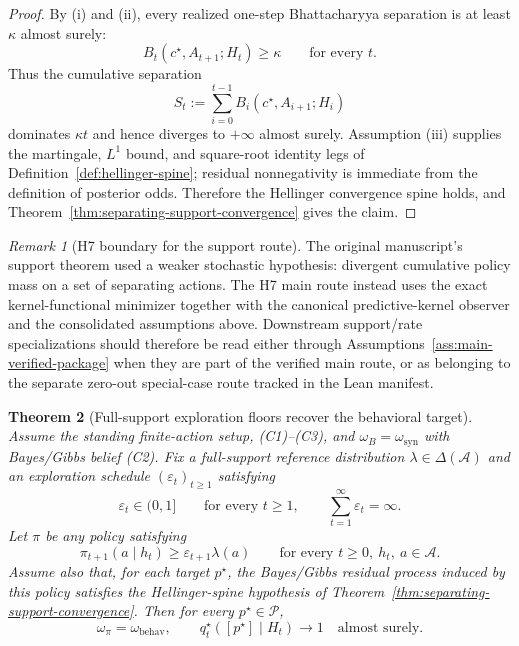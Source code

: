\documentclass[11pt]{article}
\newtheorem{theorem}{Theorem}[section]
\theoremstyle{definition}
\theoremstyle{remark}
\newtheorem{remark}[theorem]{Remark}
\newcommand{\Acal}{\mathcal{A}}
\newcommand{\Pcal}{\mathcal{P}}
\begin{document}
\begin{proof}
By (i) and (ii), every realized one-step Bhattacharyya separation is at least $\kappa$ almost surely:
\[
B_t(c^\star,A_{t+1};H_t)\ge \kappa
\qquad
\text{for every }t.
\]
Thus the cumulative separation
\[
S_t:=\sum_{i=0}^{t-1}B_i(c^\star,A_{i+1};H_i)
\]
dominates $\kappa t$ and hence diverges to $+\infty$ almost surely. Assumption (iii) supplies the martingale, $L^1$ bound, and square-root identity legs of Definition~\ref{def:hellinger-spine}; residual nonnegativity is immediate from the definition of posterior odds. Therefore the Hellinger convergence spine holds, and Theorem~\ref{thm:separating-support-convergence} gives the claim.
\end{proof}

\begin{remark}[H7 boundary for the support route]
\label{rem:h6-support-boundary}
The original manuscript's support theorem used a weaker stochastic hypothesis:
divergent cumulative policy mass on a set of separating actions. The H7 main
route instead uses the exact kernel-functional minimizer together with the
canonical predictive-kernel observer and the consolidated assumptions above.
Downstream support/rate specializations should therefore be read either through
Assumptions~\ref{ass:main-verified-package} when they are part of the verified
main route, or as belonging to the separate zero-out special-case route tracked
in the Lean manifest.
\end{remark}

\begin{theorem}[Full-support exploration floors recover the behavioral target]
\label{thm:exploration-floor-behavioral}
Assume the standing finite-action setup, \textup{(C1)--(C3)}, and $\omega_B=\omega_{\mathrm{syn}}$ with Bayes/Gibbs belief \textup{(C2)}. Fix a full-support reference distribution $\lambda\in\Delta(\Acal)$ and an exploration schedule $(\varepsilon_t)_{t\ge 1}$ satisfying
\[
\varepsilon_t\in(0,1]
\qquad\text{for every }t\ge 1,
\qquad
\sum_{t=1}^\infty \varepsilon_t=\infty.
\]
Let $\pi$ be any policy satisfying
\[
\pi_{t+1}(a\mid h_t)\ge \varepsilon_{t+1}\lambda(a)
\qquad
\text{for every }t\ge 0,\ h_t,\ a\in\Acal.
\]
Assume also that, for each target $p^\star$, the Bayes/Gibbs residual process induced by this policy satisfies the Hellinger-spine hypothesis of Theorem~\ref{thm:separating-support-convergence}.
Then for every $p^\star\in\Pcal$,
\[
\omega_\pi=\omega_{\mathrm{behav}},
\qquad
q_t^\star([p^\star]\mid H_t)\longrightarrow 1
\quad\text{almost surely.}
\]
\end{theorem}
\end{document}

